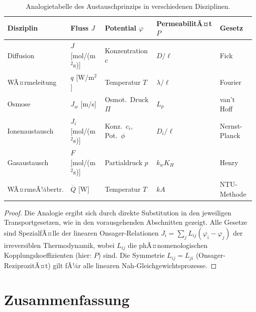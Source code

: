 ﻿\documentclass[a4paper,12pt]{article}
\theoremstyle{definition}
\begin{document}
\begin{table}[h!]
    \centering
    \caption{Analogietabelle des Austauschprinzips in verschiedenen Disziplinen.}
    \label{tab:analogie}
    \begin{tabular}{lllll}
        \toprule
        \textbf{Disziplin} & \textbf{Fluss $J$} & \textbf{Potential $\varphi$}
        & \textbf{PermeabilitÃ¤t $P$} & \textbf{Gesetz} \\
        \midrule
        Diffusion      & $J$ [mol/(m$^2$s)]  & Konzentration $c$   & $D/\ell$     & Fick \\
        WÃ¤rmeleitung   & $q$ [W/m$^2$]       & Temperatur $T$      & $\lambda/\ell$ & Fourier \\
        Osmose         & $J_w$ [m/s]         & Osmot.\ Druck $\Pi$ & $L_p$        & van't Hoff \\
        Ionenaustausch & $J_i$ [mol/(m$^2$s)]& Konz.\ $c_i$, Pot.\ $\phi$ & $D_i/\ell$ & Nernst-Planck \\
        Gasaustausch   & $F$ [mol/(m$^2$s)]  & Partialdruck $p$    & $k_w K_H$    & Henry \\
        WÃ¤rmeÃ¼bertr.   & $\dot{Q}$ [W]       & Temperatur $T$      & $kA$         & NTU-Methode \\
        \bottomrule
    \end{tabular}
\end{table}

\begin{proof}
    Die Analogie ergibt sich durch direkte Substitution in den jeweiligen
    Transportgesetzen, wie in den vorausgehenden Abschnitten gezeigt. Alle
    Gesetze sind SpezialfÃ¤lle der linearen Onsager-Relationen
    $J_i = \sum_j L_{ij}(\varphi_i - \varphi_j)$ der irre\-versiblen
    Thermodynamik, wobei $L_{ij}$ die phÃ¤nomenologischen Kopplungskoeffizienten
    (hier: $P$) sind. Die Symmetrie $L_{ij} = L_{ji}$ (Onsager-ReziprozitÃ¤t)
    gilt fÃ¼r alle linearen Nah-Gleichgewichtsprozesse. \qedhere
\end{proof}

\section{Zusammenfassung}
\end{document}

